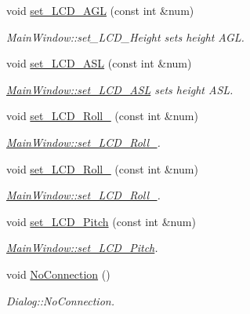 \begin{DoxyCompactItemize}
\item 
void \hyperlink{classMainWindow_a352980eb2f777cd6bd6b4a79b869058c}{set\+\_\+\+L\+C\+D\+\_\+\+A\+GL} (const int \&num)
\begin{DoxyCompactList}\small\item\em Main\+Window\+::set\+\_\+\+L\+C\+D\+\_\+\+Height sets height A\+GL. \end{DoxyCompactList}\item 
void \hyperlink{classMainWindow_a5bd9f696c1db531fc29a1324d9bd0320}{set\+\_\+\+L\+C\+D\+\_\+\+A\+SL} (const int \&num)
\begin{DoxyCompactList}\small\item\em \hyperlink{classMainWindow_a5bd9f696c1db531fc29a1324d9bd0320}{Main\+Window\+::set\+\_\+\+L\+C\+D\+\_\+\+A\+SL} sets height A\+SL. \end{DoxyCompactList}\item 
void \hyperlink{classMainWindow_ab261f3470af9f8258304c7fb9baeffd3}{set\+\_\+\+L\+C\+D\+\_\+\+Roll\+\_} (const int \&num)
\begin{DoxyCompactList}\small\item\em \hyperlink{classMainWindow_ab261f3470af9f8258304c7fb9baeffd3}{Main\+Window\+::set\+\_\+\+L\+C\+D\+\_\+\+Roll\+\_}. \end{DoxyCompactList}\item 
void \hyperlink{classMainWindow_a04d29827cd8db7c8e1cc1fbb7e75d65e}{set\+\_\+\+L\+C\+D\+\_\+\+Roll\+\_} (const int \&num)
\begin{DoxyCompactList}\small\item\em \hyperlink{classMainWindow_a04d29827cd8db7c8e1cc1fbb7e75d65e}{Main\+Window\+::set\+\_\+\+L\+C\+D\+\_\+\+Roll\+\_}. \end{DoxyCompactList}\item 
void \hyperlink{classMainWindow_abf617bf59ce6e21e5b76fbdb209df915}{set\+\_\+\+L\+C\+D\+\_\+\+Pitch} (const int \&num)
\begin{DoxyCompactList}\small\item\em \hyperlink{classMainWindow_abf617bf59ce6e21e5b76fbdb209df915}{Main\+Window\+::set\+\_\+\+L\+C\+D\+\_\+\+Pitch}. \end{DoxyCompactList}\item 
void \hyperlink{classMainWindow_a832e461c02f7e7a704cb6eea7afbcf72}{No\+Connection} ()
\begin{DoxyCompactList}\small\item\em Dialog\+::\+No\+Connection. \end{DoxyCompactList}\end{DoxyCompactItemize}


